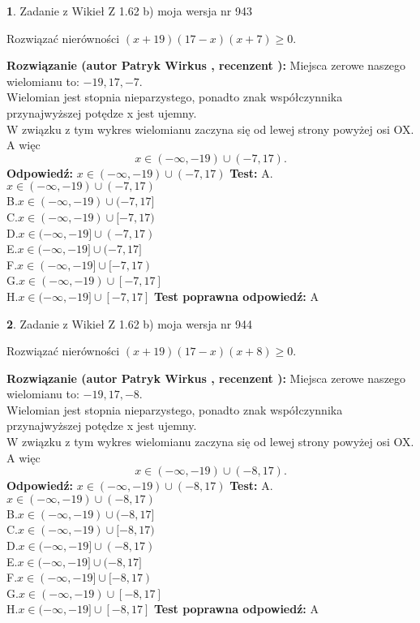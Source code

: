 \documentclass[12pt, a4paper]{article}
\theoremstyle{definition} %
\newtheorem{zad}{}
\newcommand{\zadStart}[1]{\begin{zad}#1\newline}
\newcommand{\zadStop}{\end{zad}}
\newcommand{\rozwStart}[2]{\noindent \textbf{Rozwiązanie (autor #1 , recenzent #2): }\newline}
\newcommand{\rozwStop}{\newline}
\newcommand{\odpStart}{\noindent \textbf{Odpowiedź:}\newline}
\newcommand{\odpStop}{\newline}
\newcommand{\testStart}{\noindent \textbf{Test:}\newline}
\newcommand{\testStop}{\newline}
\newcommand{\kluczStart}{\noindent \textbf{Test poprawna odpowiedź:}\newline}
\newcommand{\kluczStop}{\newline}
\begin{document}
\zadStart{Zadanie z Wikieł Z 1.62 b) moja wersja nr 943}

Rozwiązać nierówności $(x+19)(17-x)(x+7)\ge0$.
\zadStop
\rozwStart{Patryk Wirkus}{}
Miejsca zerowe naszego wielomianu to: $-19, 17, -7$.\\
Wielomian jest stopnia nieparzystego, ponadto znak współczynnika przy\linebreak najwyższej potędze x jest ujemny.\\ W związku z tym wykres wielomianu zaczyna się od lewej strony powyżej osi OX. A więc $$x \in (-\infty,-19) \cup (-7,17).$$
\rozwStop
\odpStart
$x \in (-\infty,-19) \cup (-7,17)$
\odpStop
\testStart
A.$x \in (-\infty,-19) \cup (-7,17)$\\
B.$x \in (-\infty,-19) \cup (-7,17]$\\
C.$x \in (-\infty,-19) \cup [-7,17)$\\
D.$x \in (-\infty,-19] \cup (-7,17)$\\
E.$x \in (-\infty,-19] \cup (-7,17]$\\
F.$x \in (-\infty,-19] \cup [-7,17)$\\
G.$x \in (-\infty,-19) \cup [-7,17]$\\
H.$x \in (-\infty,-19] \cup [-7,17]$
\testStop
\kluczStart
A
\kluczStop



\zadStart{Zadanie z Wikieł Z 1.62 b) moja wersja nr 944}

Rozwiązać nierówności $(x+19)(17-x)(x+8)\ge0$.
\zadStop
\rozwStart{Patryk Wirkus}{}
Miejsca zerowe naszego wielomianu to: $-19, 17, -8$.\\
Wielomian jest stopnia nieparzystego, ponadto znak współczynnika przy\linebreak najwyższej potędze x jest ujemny.\\ W związku z tym wykres wielomianu zaczyna się od lewej strony powyżej osi OX. A więc $$x \in (-\infty,-19) \cup (-8,17).$$
\rozwStop
\odpStart
$x \in (-\infty,-19) \cup (-8,17)$
\odpStop
\testStart
A.$x \in (-\infty,-19) \cup (-8,17)$\\
B.$x \in (-\infty,-19) \cup (-8,17]$\\
C.$x \in (-\infty,-19) \cup [-8,17)$\\
D.$x \in (-\infty,-19] \cup (-8,17)$\\
E.$x \in (-\infty,-19] \cup (-8,17]$\\
F.$x \in (-\infty,-19] \cup [-8,17)$\\
G.$x \in (-\infty,-19) \cup [-8,17]$\\
H.$x \in (-\infty,-19] \cup [-8,17]$
\testStop
\kluczStart
A
\kluczStop
\end{document}
